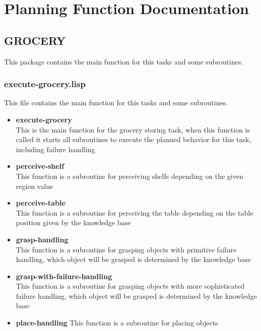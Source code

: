\documentclass[main.tex]{subfiles}
\begin{document}
	\begingroup

	\renewcommand{\cleardoublepage}{}

	\renewcommand{\clearpage}{}

	\chapter{Planning Function Documentation}

		
		\section{GROCERY}
		This package contains the main function for this tasks and some subroutines.
		\subsection{execute-grocery.lisp}
		This file contains the main function for this tasks and some subroutines.
		\begin{itemize}
			\item \textbf{execute-grocery} \\
			This is the main function for the grocery storing task, when this function is called it starts all subroutines to execute the planned behavior for this task, including failure handling
			\item \textbf{perceive-shelf} \\
			This function is a subroutine for perceiving shelfs depending on the given region value
			\item \textbf{perceive-table} \\
			This function is a subroutine for perceiving the table depending on the table position given by the knowledge base
			\item \textbf{grasp-handling} \\
			This function is a subroutine for grasping objects with primitive failure handling, which object will be grasped is determined by the knowledge base
			\item \textbf{grasp-with-failure-handling} \\
			This function is a subroutine for grasping objects with more sophisticated failure handling, which object will be grasped is determined by the knowledge base
			\item \textbf{place-handling}
			This function is a subroutine for placing objects
		\end{itemize}
		
\end{document}
